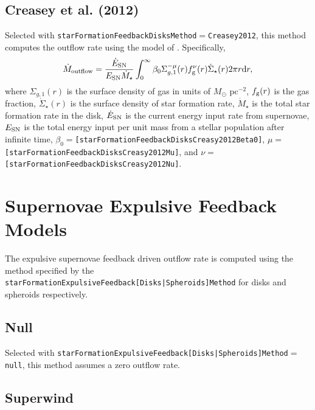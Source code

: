 \subsection{Creasey et al. (2012)}

Selected with {\tt starFormationFeedbackDisksMethod}$=${\tt Creasey2012}, this method computes the outflow rate using the model of \cite{creasey_how_2012}. Specifically,
\begin{equation}
\dot{M}_{\rm outflow} = {\dot{E}_{\rm SN} \over E_{\rm SN} \dot{M}_\star} \int_0^\infty \beta_0 \Sigma_{g,1}^{-\mu}(r) f_{\rm g}^\nu(r) \dot{\Sigma}_\star(r) 2 \pi r {\rm d}r,
\end{equation}
where $\Sigma_{g,1}(r)$ is the surface density of gas in units of $M_\odot$ pc$^{-2}$, $f_{\rm g}(r)$ is the gas fraction, $\dot{\Sigma}_\star(r)$ is the surface density of star formation rate, $\dot{M}_\star$ is the total star formation rate in the disk, $\dot{E}_{\rm SN}$ is the current energy input rate from supernovae, $E_{\rm SN}$ is the total energy input per unit mass from a stellar population after infinite time, $\beta_0=${\tt [starFormationFeedbackDisksCreasy2012Beta0]}, $\mu=${\tt [starFormationFeedbackDisksCreasy2012Mu]}, and $\nu=${\tt [starFormationFeedbackDisksCreasy2012Nu]}.

\section{Supernovae Expulsive Feedback Models}\label{sec:sneExpulsiveFeedback}

The expulsive supernovae feedback driven outflow rate is computed using the method specified by the {\tt starFormationExpulsiveFeedback[Disks|Spheroids]Method} for disks and spheroids respectively.

\subsection{Null}

Selected with {\tt starFormationExpulsiveFeedback[Disks|Spheroids]Method}$=${\tt null}, this method assumes a zero outflow rate.

\subsection{Superwind}

